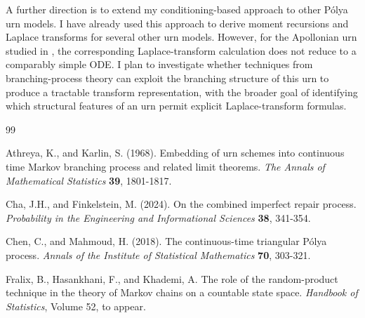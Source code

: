 \documentclass[11pt]{article}
\newenvironment{changemargin}[2]{%
\begin{list}{}{%
\setlength{\topsep}{0pt}%
\setlength{\leftmargin}{#1}%
\setlength{\rightmargin}{#2}%
\setlength{\listparindent}{\parindent}%
\setlength{\itemindent}{\parindent}%
\setlength{\parsep}{\parskip}%
}%
\item[]}{\end{list}}
\begin{document}
\begin{changemargin}{-0.5cm}{-0.5cm}
A further direction is to extend my conditioning-based approach to other Pólya urn models. I have already used this approach to derive moment recursions and Laplace transforms for several other urn models. However, for the Apollonian urn studied in \cite{ZhangMahmoud2016}, the corresponding Laplace-transform calculation does not reduce to a comparably simple ODE. I plan to investigate whether techniques from branching-process theory can exploit the branching structure of this urn to produce a tractable transform representation, with the broader goal of identifying which structural features of an urn permit explicit Laplace-transform formulas.



\begin{thebibliography}{99}%

    Athreya, K., and Karlin, S. (1968).
    Embedding of urn schemes into continuous time Markov branching process and related limit theorems.
    {\em The Annals of Mathematical Statistics} {\bf 39}, 1801-1817.


    Cha, J.H., and Finkelstein, M. (2024).
    On the combined imperfect repair process.
    {\em Probability in the Engineering and Informational Sciences} {\bf 38}, 341-354.
    

    Chen, C., and Mahmoud, H. (2018).
    The continuous-time triangular P\'{o}lya process.
    {\em Annals of the Institute of Statistical Mathematics} {\bf 70}, 303-321.

    Fralix, B., Hasankhani, F., and Khademi, A. The role of the random-product technique in
    the theory of Markov chains on a countable state space.
    \textit{Handbook of Statistics}, Volume 52, to appear.


\end{thebibliography}
\end{changemargin}
\end{document}
